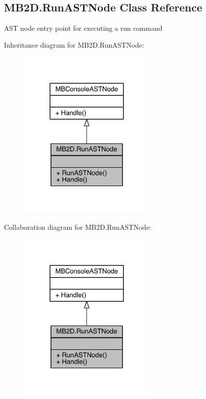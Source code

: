 \hypertarget{class_m_b2_d_1_1_run_a_s_t_node}{}\subsection{M\+B2\+D.\+Run\+A\+S\+T\+Node Class Reference}
\label{class_m_b2_d_1_1_run_a_s_t_node}


A\+ST node entry point for executing a run command  




Inheritance diagram for M\+B2\+D.\+Run\+A\+S\+T\+Node\+:
\nopagebreak
\begin{figure}[H]
\begin{center}
\leavevmode
\includegraphics[width=191pt]{class_m_b2_d_1_1_run_a_s_t_node__inherit__graph}
\end{center}
\end{figure}


Collaboration diagram for M\+B2\+D.\+Run\+A\+S\+T\+Node\+:
\nopagebreak
\begin{figure}[H]
\begin{center}
\leavevmode
\includegraphics[width=191pt]{class_m_b2_d_1_1_run_a_s_t_node__coll__graph}
\end{center}
\end{figure}
